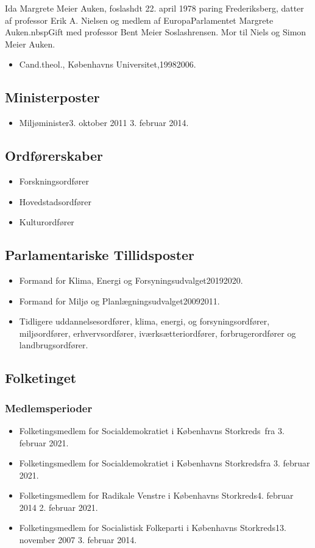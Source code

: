 \documentclass[11pt, a4paper]{awesome-cv}
\begin{document}
\makecvheader[R]
\makelettertitle
\begin{cvletter}
Ida Margrete Meier Auken, foslashdt 22. april 1978 paring Frederiksberg, datter af professor Erik A. Nielsen og medlem af EuropaParlamentet Margrete Auken.nbspGift med professor Bent Meier Soslashrensen. Mor til Niels og Simon Meier Auken.

\begin{itemize}
\item Cand.theol., Københavns Universitet,19982006.
\end{itemize}
\subsection*{Ministerposter}
\begin{itemize}
\item Miljøminister3. oktober 2011  3. februar 2014.
\end{itemize}
\subsection*{Ordførerskaber}
\begin{itemize}
\item Forskningsordfører
\item Hovedstadsordfører
\item Kulturordfører
\end{itemize}
\subsection*{Parlamentariske Tillidsposter}
\begin{itemize}
\item Formand for Klima, Energi og Forsyningsudvalget20192020.
\item Formand for Miljø og Planlægningsudvalget20092011.
\item Tidligere uddannelsesordfører, klima, energi, og forsyningsordfører, miljøordfører, erhvervsordfører, iværksætteriordfører, forbrugerordfører og landbrugsordfører.
\end{itemize}
\subsection*{Folketinget}
\subsubsection*{Medlemsperioder}
\begin{itemize}
\item Folketingsmedlem for Socialdemokratiet i Københavns Storkreds fra 3. februar 2021.
\item Folketingsmedlem for Socialdemokratiet i Københavns Storkredsfra 3. februar 2021.
\item Folketingsmedlem for Radikale Venstre i Københavns Storkreds4. februar 2014  2. februar 2021.
\item Folketingsmedlem for Socialistisk Folkeparti i Københavns Storkreds13. november 2007  3. februar 2014.
\end{itemize}

\end{cvletter}
\end{document}
